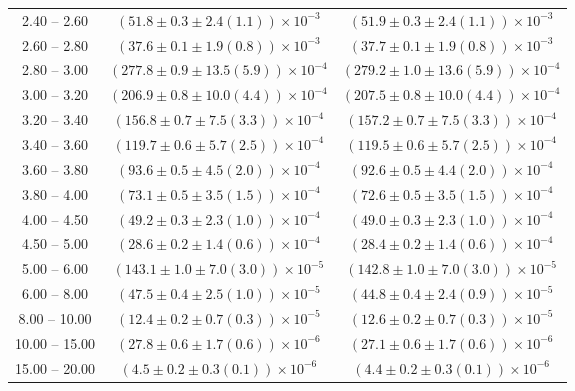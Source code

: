 \begin{table}
\begin{center}
\begin{tabular}{ c | c c }
2.40 -- 2.60 & $(51.8\pm0.3\pm2.4(1.1))\times10^{-3}$ & $(51.9\pm0.3\pm2.4(1.1))\times10^{-3}$ \\ 
2.60 -- 2.80 & $(37.6\pm0.1\pm1.9(0.8))\times10^{-3}$ & $(37.7\pm0.1\pm1.9(0.8))\times10^{-3}$ \\ 
2.80 -- 3.00 & $(277.8\pm0.9\pm13.5(5.9))\times10^{-4}$ & $(279.2\pm1.0\pm13.6(5.9))\times10^{-4}$ \\ 
3.00 -- 3.20 & $(206.9\pm0.8\pm10.0(4.4))\times10^{-4}$ & $(207.5\pm0.8\pm10.0(4.4))\times10^{-4}$ \\ 
3.20 -- 3.40 & $(156.8\pm0.7\pm7.5(3.3))\times10^{-4}$ & $(157.2\pm0.7\pm7.5(3.3))\times10^{-4}$ \\ 
3.40 -- 3.60 & $(119.7\pm0.6\pm5.7(2.5))\times10^{-4}$ & $(119.5\pm0.6\pm5.7(2.5))\times10^{-4}$ \\ 
3.60 -- 3.80 & $(93.6\pm0.5\pm4.5(2.0))\times10^{-4}$ & $(92.6\pm0.5\pm4.4(2.0))\times10^{-4}$ \\ 
3.80 -- 4.00 & $(73.1\pm0.5\pm3.5(1.5))\times10^{-4}$ & $(72.6\pm0.5\pm3.5(1.5))\times10^{-4}$ \\ 
4.00 -- 4.50 & $(49.2\pm0.3\pm2.3(1.0))\times10^{-4}$ & $(49.0\pm0.3\pm2.3(1.0))\times10^{-4}$ \\ 
4.50 -- 5.00 & $(28.6\pm0.2\pm1.4(0.6))\times10^{-4}$ & $(28.4\pm0.2\pm1.4(0.6))\times10^{-4}$ \\ 
5.00 -- 6.00 & $(143.1\pm1.0\pm7.0(3.0))\times10^{-5}$ & $(142.8\pm1.0\pm7.0(3.0))\times10^{-5}$ \\ 
6.00 -- 8.00 & $(47.5\pm0.4\pm2.5(1.0))\times10^{-5}$ & $(44.8\pm0.4\pm2.4(0.9))\times10^{-5}$ \\ 
8.00 -- 10.00 & $(12.4\pm0.2\pm0.7(0.3))\times10^{-5}$ & $(12.6\pm0.2\pm0.7(0.3))\times10^{-5}$ \\ 
10.00 -- 15.00 & $(27.8\pm0.6\pm1.7(0.6))\times10^{-6}$ & $(27.1\pm0.6\pm1.7(0.6))\times10^{-6}$ \\ 
15.00 -- 20.00 & $(4.5\pm0.2\pm0.3(0.1))\times10^{-6}$ & $(4.4\pm0.2\pm0.3(0.1))\times10^{-6}$ \\ 
\hline
\end{tabular}
\end{center}
\end{table}
 
